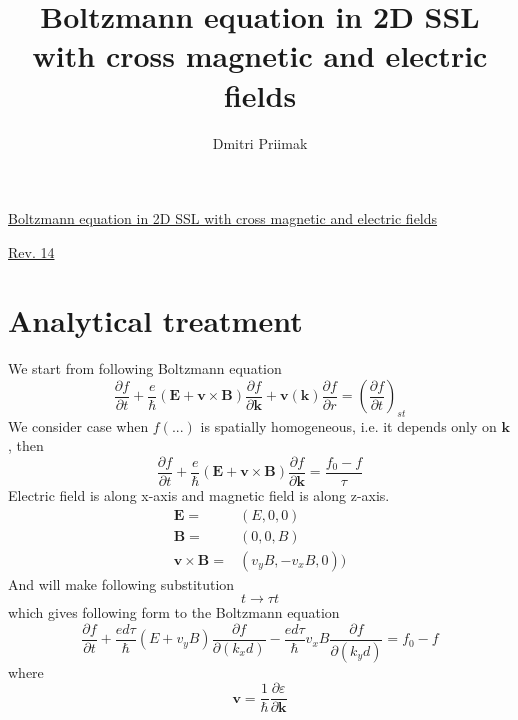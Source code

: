 \documentclass[40pt,letterpaper,physrev]{article}
\author{Dmitri Priimak}
\title{Boltzmann equation in 2D SSL with cross magnetic and electric fields}
\begin{document}
\newcommand{\ddx}[2] {
	\frac{\text{d}#1}{\text{d}#2}
}
\newcommand{\ddt}[1] {
	\frac{\text{d}#1}{\text{d}t}
}
\newcommand{\dtwodt}[1] {
	\frac{\text{d}^{2}#1}{\text{d}t^{2}}
}
 \begin{center}
  \underline{Boltzmann equation in 2D SSL with cross magnetic and electric fields}
 \end{center}
  \begin{center}
    \underline{Rev. 14}
  \end{center}
  \section{Analytical treatment}
	We start from following Boltzmann equation
    \begin{equation}\label{eq:boltzmann}
     \frac{\partial f}{\partial t}+
     \frac{e}{\hbar}\left ( \mathbf{E} + \mathbf{v}\times\mathbf{B} \right ) \frac{\partial f}{\partial\mathbf{k}}+
     \mathbf{v}(\mathbf{k})\frac{\partial f}{\partial r} = \left ( \frac{\partial f}{\partial t} \right )_{st}
    \end{equation}
    We consider case when $f(...)$ is spatially homogeneous, i.e. it depends only on $\mathbf{k}$, then
    \begin{equation}\label{eq:boltzmann_homo}
     \frac{\partial f}{\partial t}+
     \frac{e}{\hbar}\left ( \mathbf{E} + \mathbf{v}\times\mathbf{B} \right ) \frac{\partial f}{\partial\mathbf{k}}
     = \frac{f_0 - f}{\tau}
    \end{equation}
    Electric field is along x-axis and magnetic field is along z-axis.
    \begin{align}
     \mathbf{E}=&(E,0,0) \\
     \mathbf{B}=&(0,0,B) \\
     \mathbf{v}\times\mathbf{B}=&(v_y B, -v_x B, 0))
    \end{align}
    And will make following substitution
    \begin{equation}
     t \to \tau t
    \end{equation}
    which gives following form to the Boltzmann equation
    \begin{equation}
     \frac{\partial f}{\partial t}+
     \frac{ed\tau}{\hbar}(E+v_{y}B)\frac{\partial f}{\partial(k_x d)}-
     \frac{ed\tau}{\hbar}v_{x}B\frac{\partial f}{\partial(k_y d)}
     = f_0 - f
    \end{equation}
    where 
    \begin{equation}
     \mathbf{v}=\frac{1}{\hbar}\frac{\partial\varepsilon}{\partial\mathbf{k}}
    \end{equation}
\end{document}
